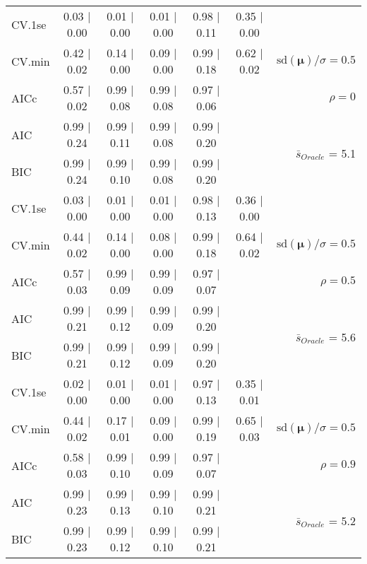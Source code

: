 \begin{table}
\begin{center}
\begin{tabular}{l*{5}{c}|r}
 \hline 
CV.1se & 0.03 $\mid$ 0.00 & 0.01 $\mid$ 0.00 & 0.01 $\mid$ 0.00 & 0.98 $\mid$ 0.11 & 0.35 $\mid$ 0.00 & \\
CV.min & 0.42 $\mid$ 0.02 & 0.14 $\mid$ 0.00 & 0.09 $\mid$ 0.00 & 0.99 $\mid$ 0.18 & 0.62 $\mid$ 0.02 &  $\mathrm{sd}(\mathbf{\mu})/\sigma=0.5$ \\
AICc & 0.57 $\mid$ 0.02 & 0.99 $\mid$ 0.08 & 0.99 $\mid$ 0.08 & 0.97 $\mid$ 0.06 & & $\rho=0$ \\
AIC & 0.99 $\mid$ 0.24 & 0.99 $\mid$ 0.11 & 0.99 $\mid$ 0.08 & 0.99 $\mid$ 0.20 & &  \multirow{2}{*}{$\bar{s}_{Oracle}$ = 5.1} \\
BIC & 0.99 $\mid$ 0.24 & 0.99 $\mid$ 0.10 & 0.99 $\mid$ 0.08 & 0.99 $\mid$ 0.20 & &  \\
 \hline 
CV.1se & 0.03 $\mid$ 0.00 & 0.01 $\mid$ 0.00 & 0.01 $\mid$ 0.00 & 0.98 $\mid$ 0.13 & 0.36 $\mid$ 0.00 & \\
CV.min & 0.44 $\mid$ 0.02 & 0.14 $\mid$ 0.00 & 0.08 $\mid$ 0.00 & 0.99 $\mid$ 0.18 & 0.64 $\mid$ 0.02 &  $\mathrm{sd}(\mathbf{\mu})/\sigma=0.5$ \\
AICc & 0.57 $\mid$ 0.03 & 0.99 $\mid$ 0.09 & 0.99 $\mid$ 0.09 & 0.97 $\mid$ 0.07 & & $\rho=0.5$ \\
AIC & 0.99 $\mid$ 0.21 & 0.99 $\mid$ 0.12 & 0.99 $\mid$ 0.09 & 0.99 $\mid$ 0.20 & &  \multirow{2}{*}{$\bar{s}_{Oracle}$ = 5.6} \\
BIC & 0.99 $\mid$ 0.21 & 0.99 $\mid$ 0.12 & 0.99 $\mid$ 0.09 & 0.99 $\mid$ 0.20 & &  \\
 \hline 
CV.1se & 0.02 $\mid$ 0.00 & 0.01 $\mid$ 0.00 & 0.01 $\mid$ 0.00 & 0.97 $\mid$ 0.13 & 0.35 $\mid$ 0.01 & \\
CV.min & 0.44 $\mid$ 0.02 & 0.17 $\mid$ 0.01 & 0.09 $\mid$ 0.00 & 0.99 $\mid$ 0.19 & 0.65 $\mid$ 0.03 &  $\mathrm{sd}(\mathbf{\mu})/\sigma=0.5$ \\
AICc & 0.58 $\mid$ 0.03 & 0.99 $\mid$ 0.10 & 0.99 $\mid$ 0.09 & 0.97 $\mid$ 0.07 & & $\rho=0.9$ \\
AIC & 0.99 $\mid$ 0.23 & 0.99 $\mid$ 0.13 & 0.99 $\mid$ 0.10 & 0.99 $\mid$ 0.21 & &  \multirow{2}{*}{$\bar{s}_{Oracle}$ = 5.2} \\
BIC & 0.99 $\mid$ 0.23 & 0.99 $\mid$ 0.12 & 0.99 $\mid$ 0.10 & 0.99 $\mid$ 0.21 & &  \\
 \hline 
\end{tabular}
\end{center}
\vspace{-1cm}
\end{table}




